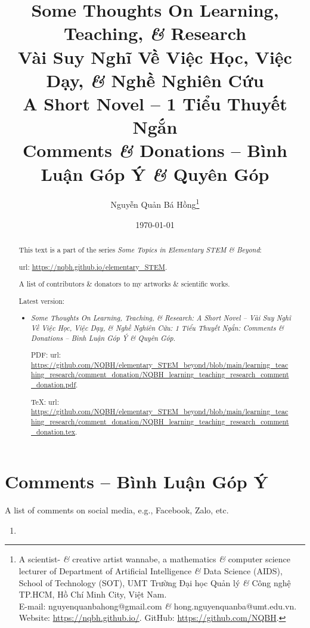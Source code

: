 \documentclass{article}
\title{Some Thoughts On Learning, Teaching, {\it\&} Research\\Vài Suy Nghĩ Về Việc Học, Việc Dạy, {\it\&} Nghề Nghiên Cứu\\{\Large\sf A Short Novel -- 1 Tiểu Thuyết Ngắn}\\Comments {\it\&} Donations -- Bình Luận Góp Ý {\it\&} Quyên Góp}
\author{Nguyễn Quản Bá Hồng\footnote{A scientist- {\it\&} creative artist wannabe, a mathematics {\it\&} computer science lecturer of Department of Artificial Intelligence {\it\&} Data Science (AIDS), School of Technology (SOT), UMT Trường Đại học Quản lý {\it\&} Công nghệ TP.HCM, Hồ Chí Minh City, Việt Nam.\\E-mail: {\sf nguyenquanbahong@gmail.com} {\it\&} {\sf hong.nguyenquanba@umt.edu.vn}. Website: \url{https://nqbh.github.io/}. GitHub: \url{https://github.com/NQBH}.}}
\date{\today}
\begin{document}
\maketitle
\begin{abstract}
	This text is a part of the series {\it Some Topics in Elementary STEM \& Beyond}:
	
	{\sc url}: \url{https://nqbh.github.io/elementary_STEM}.
	
	A list of contributors \& donators to my artworks \& scientific works.
	
	Latest version:
	\begin{itemize}
		\item {\it Some Thoughts On Learning, Teaching, \& Research: A Short Novel -- Vài Suy Nghĩ Về Việc Học, Việc Dạy, \& Nghề Nghiên Cứu: 1 Tiểu Thuyết Ngắn: Comments \& Donations -- Bình Luận Góp Ý \& Quyên Góp}.
		
		PDF: {\sc url}: \url{https://github.com/NQBH/elementary_STEM_beyond/blob/main/learning_teaching_research/comment_donation/NQBH_learning_teaching_research_comment_donation.pdf}.
		
		\TeX: {\sc url}: \url{https://github.com/NQBH/elementary_STEM_beyond/blob/main/learning_teaching_research/comment_donation/NQBH_learning_teaching_research_comment_donation.tex}.
	\end{itemize}
\end{abstract}
\tableofcontents


\section{Comments -- Bình Luận Góp Ý}
A list of comments on social media, e.g., Facebook, Zalo, etc.
\begin{enumerate}
	\item 
\end{enumerate}
\end{document}
